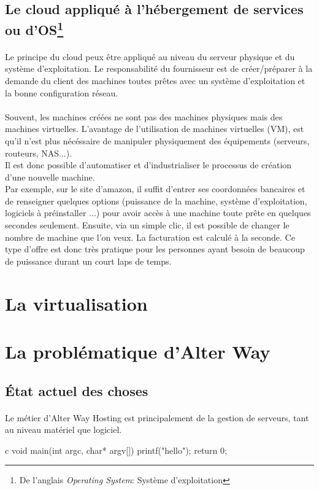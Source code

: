 \subsection{Le cloud appliqué à l'hébergement de services ou d'OS\protect\footnote{De l'anglais \textit{Operating System}: Système d'exploitation}}
\paragraph*{}
Le principe du cloud peux être appliqué au niveau du serveur physique et du système d'exploitation. Le responsabilité du fournisseur est de créer/préparer
à la demande du client des machines toutes prêtes avec un système d'exploitation et la bonne configuration réseau.

\paragraph*{}
Souvent, les machines créées ne sont pas des machines physiques mais des machines virtuelles. L'avantage de l'utilisation de machines virtuelles (VM), est
qu'il n'est plus nécéssaire de manipuler physiquement des équipements (serveurs, routeurs, NAS...).
\\
Il est donc possible d'automatiser et d'industrialiser le processus de création d'une nouvelle machine.
\\
Par exemple, sur le site d'amazon, il suffit d'entrer ses coordonnées bancaires et de renseigner quelques options (puissance de la machine, système d'exploitation, logiciels à préinstaller ...)
 pour avoir accès à une machine toute prête en quelques secondes seulement. Ensuite, via un simple clic, il est possible de changer le nombre de machine que l'on veux.
La facturation est calculé à la seconde. Ce type d'offre est donc très pratique pour les personnes ayant besoin de beaucoup de puissance durant un court laps de temps.



\section{La virtualisation}\label{virtualisation}

\section{La problématique d'Alter Way}
\subsection{État actuel des choses}
\paragraph*{}
Le métier d'Alter Way Hosting est principalement de la gestion de serveurs, tant au niveau matériel que logiciel.


\begin{pygmented}{c}
void main(int argc, char* argv[])
{
	printf("hello");
	return 0;
}
\end{pygmented}

\cite{test}
